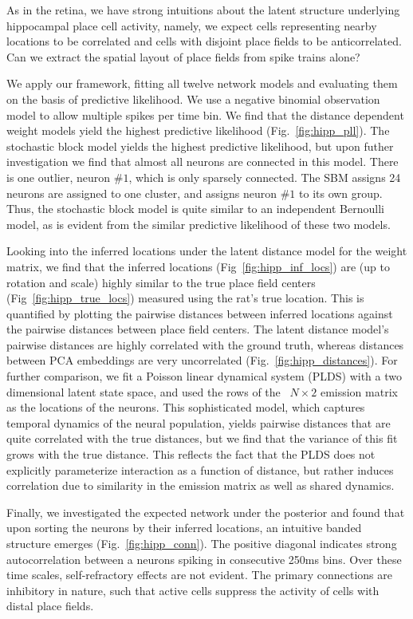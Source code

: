 As in the retina, we have strong intuitions about the latent structure
underlying hippocampal place cell activity, namely, we expect cells
representing nearby locations to be correlated and cells with disjoint
place fields to be anticorrelated. Can we extract the spatial layout
of place fields from spike trains alone?

We apply our framework, fitting all twelve network models and
evaluating them on the basis of predictive likelihood. We use a
negative binomial observation model to allow multiple spikes per time
bin. We find that the distance dependent weight models yield the
highest predictive likelihood (Fig.~\ref{fig:hipp_pll}). The
stochastic block model yields the highest predictive likelihood, but
upon futher investigation we find that almost all neurons are
connected in this model. There is one outlier, neuron \#$1$, which is
only sparsely connected. The SBM assigns 24 neurons are assigned to
one cluster, and assigns neuron \#$1$ to its own group.  Thus, the
stochastic block model is quite similar to an independent Bernoulli
model, as is evident from the similar predictive likelihood of these
two models.

Looking into the inferred locations under the latent distance model
for the weight matrix, we find that the inferred locations
(Fig~\ref{fig:hipp_inf_locs}) are (up to rotation and scale) highly
similar to the true place field centers (Fig~\ref{fig:hipp_true_locs})
measured using the rat's true location. This is quantified by plotting
the pairwise distances between inferred locations against the pairwise
distances between place field centers. The latent distance model's
pairwise distances are highly correlated with the ground truth,
whereas distances between PCA embeddings are very uncorrelated
(Fig.~\ref{fig:hipp_distances}). For further comparison, we fit a
Poisson linear dynamical system (PLDS) \cite{macke2011empirical} with
a two dimensional latent state space, and used the rows of the
~$N \times 2$ emission matrix as the locations of the neurons. This
sophisticated model, which captures temporal dynamics of the neural
population, yields pairwise distances that are quite correlated with
the true distances, but we find that the variance of this fit grows
with the true distance.  This reflects the fact that the PLDS does not
explicitly parameterize interaction as a function of distance, but
rather induces correlation due to similarity in the emission matrix as
well as shared dynamics.

Finally, we investigated the expected network under the posterior and 
found that upon sorting the neurons by their inferred locations, an
intuitive banded structure emerges (Fig.~\ref{fig:hipp_conn}). 
The positive diagonal indicates strong autocorrelation between a 
neurons spiking in consecutive 250ms bins. Over these time scales, 
self-refractory effects are not evident. The primary connections 
are inhibitory in nature, such that active cells suppress the activity 
of cells with distal place fields. 

